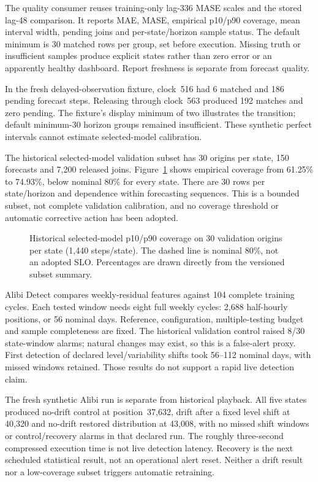 \documentclass[a4paper,11pt]{article}
\begin{document}
The quality consumer reuses training-only lag-336 MASE scales and the stored
lag-48 comparison. It reports MAE, MASE, empirical p10/p90 coverage, mean interval
width, pending joins and per-state/horizon sample status. The default minimum is
30 matched rows per group, set before execution. Missing truth or insufficient
samples produce explicit states rather than zero error or an apparently healthy
dashboard. Report freshness is separate from forecast quality.

In the fresh delayed-observation fixture, clock~516 had 6 matched and 186 pending
forecast steps. Releasing through clock~563 produced 192 matches and zero pending.
The fixture's display minimum of two illustrates the transition; default
minimum-30 horizon groups remained insufficient. These synthetic perfect
intervals cannot estimate selected-model calibration.

The historical selected-model validation subset has 30 origins per state,
150 forecasts and 7,200 released joins. Figure~\ref{fig:coverage} shows empirical
coverage from 61.25\% to 74.93\%, below nominal 80\% for every state. There are
30 rows per state/horizon and dependence within forecasting sequences. This is a
bounded subset, not complete validation calibration, and no coverage threshold or
automatic corrective action has been adopted.

\begin{figure}[ht]\centering

\caption{Historical selected-model p10/p90 coverage on 30 validation origins per
state (1,440 steps/state). The dashed line is nominal 80\%, not an adopted SLO.
Percentages are drawn directly from the versioned subset summary.}\label{fig:coverage}
\end{figure}

Alibi Detect compares weekly-residual features against 104 complete training
cycles. Each tested window needs eight full weekly cycles: 2,688 half-hourly
positions, or 56 nominal days. Reference, configuration, multiple-testing budget
and sample completeness are fixed. The historical validation control raised
8/30 state-window alarms; natural changes may exist, so this is a false-alert
proxy. First detection of declared level/variability shifts took 56--112 nominal
days, with missed windows retained. Those results do not support a rapid live
detection claim.

The fresh synthetic Alibi run is separate from historical playback. All five
states produced no-drift control at position~37,632, drift after a fixed level
shift at 40,320 and no-drift restored distribution at 43,008, with no missed shift
windows or control/recovery alarms in that declared run. The roughly three-second
compressed execution time is not live detection latency. Recovery is the next
scheduled statistical result, not an operational alert reset. Neither a drift
result nor a low-coverage subset triggers automatic retraining.
\end{document}

